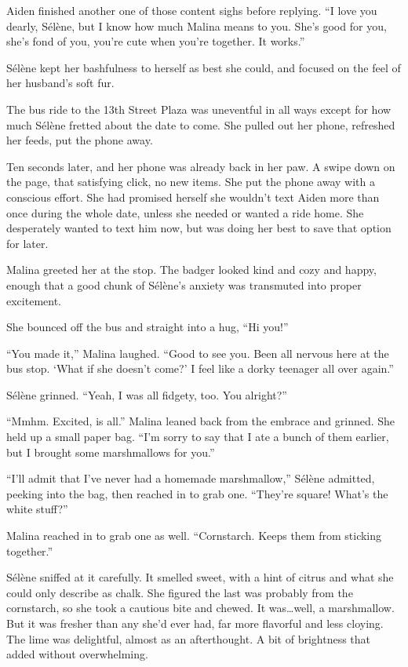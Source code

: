 Aiden finished another one of those content sighs before replying. ``I love you dearly, Sélène, but I know how much Malina means to you. She's good for you, she's fond of you, you're cute when you're together. It works.''

Sélène kept her bashfulness to herself as best she could, and focused on the feel of her husband's soft fur.

\secdiv{}

\noindent The bus ride to the 13th Street Plaza was uneventful in all ways except for how much Sélène fretted about the date to come. She pulled out her phone, refreshed her feeds, put the phone away.

Ten seconds later, and her phone was already back in her paw. A swipe down on the page, that satisfying click, no new items. She put the phone away with a conscious effort. She had promised herself she wouldn't text Aiden more than once during the whole date, unless she needed or wanted a ride home. She desperately wanted to text him now, but was doing her best to save that option for later.

Malina greeted her at the stop. The badger looked kind and cozy and happy, enough that a good chunk of Sélène's anxiety was transmuted into proper excitement.

She bounced off the bus and straight into a hug, ``Hi you!''

``You made it,'' Malina laughed. ``Good to see you. Been all nervous here at the bus stop. `What if she doesn't come?' I feel like a dorky teenager all over again.''

Sélène grinned. ``Yeah, I was all fidgety, too. You alright?''

``Mmhm. Excited, is all.'' Malina leaned back from the embrace and grinned. She held up a small paper bag. ``I'm sorry to say that I ate a bunch of them earlier, but I brought some marshmallows for you.''

``I'll admit that I've never had a homemade marshmallow,'' Sélène admitted, peeking into the bag, then reached in to grab one. ``They're square! What's the white stuff?''

Malina reached in to grab one as well. ``Cornstarch. Keeps them from sticking together.''

Sélène sniffed at it carefully. It smelled sweet, with a hint of citrus and what she could only describe as chalk. She figured the last was probably from the cornstarch, so she took a cautious bite and chewed. It was\ldots{}well, a marshmallow. But it was fresher than any she'd ever had, far more flavorful and less cloying. The lime was delightful, almost as an afterthought. A bit of brightness that added without overwhelming.


